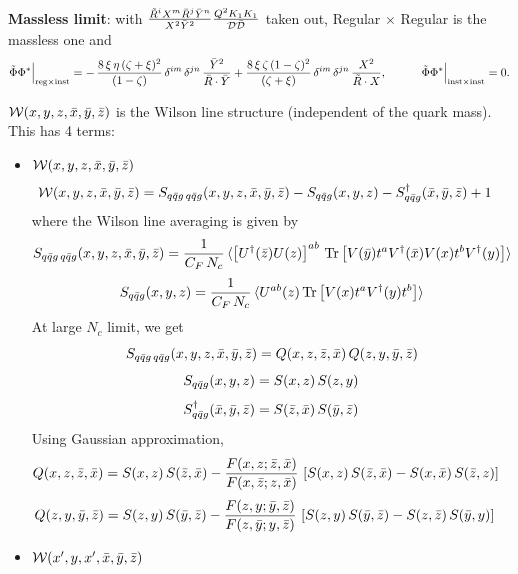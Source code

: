 \documentclass[9pt]{article}
\numberwithin{equation}{section}
\begin{document}
\textbf{Massless limit}: with $\frac{\Tilde{R}^{i}X^{m}\Bar{R}^{j}\Bar{Y}^{n}}{X^{2}\Bar{Y}^{2}}\frac{Q^{2}K_{1}K_{1}}{\mathcal{D}\Bar{\mathcal{D}}}$ taken out, Regular $\times$ Regular is the massless one and
$$\Tilde{\Phi}\Phi^{*}\Big|_{\text{reg}\times\text{inst}} = -\,\frac{8\,\xi\,\eta\,(\zeta+\xi)^{2}}{(1-\zeta)}\,\delta^{im}\,\delta^{jn}\,\frac{\Bar{Y}^{2}}{\Bar{R}\cdot\Bar{Y}} + \frac{8\,\xi\,\zeta\,(1-\zeta)^{2}}{(\zeta+\xi)}\,\delta^{im}\,\delta^{jn}\,\frac{X^{2}}{\Tilde{R}\cdot X},\hspace{3em}\Tilde{\Phi}\Phi^{*}\Big|_{\text{inst}\times\text{inst}}=0.$$

$\mathcal{W}(x,y,z,\Bar{x},\Bar{y},\Bar{z})$ is the Wilson line structure (independent of the quark mass). This has 4 terms:

\begin{itemize}
    \item $\mathcal{W}(x,y,z,\Bar{x},\Bar{y},\Bar{z})$
    \begin{align}
        \mathcal{W}(x,y,z,\Bar{x},\Bar{y},\Bar{z}) & = S_{q\Bar{q}g\,q\Bar{q}g}(x,y,z,\Bar{x},\Bar{y},\Bar{z}) -S_{q\Bar{q}g}(x,y,z) - S^{\dagger}_{q\Bar{q}g}(\Bar{x},\Bar{y},\Bar{z}) + 1
    \end{align}
where the Wilson line averaging is given by 
$$S_{q\Bar{q}g\,q\Bar{q}g}(x,y,z,\Bar{x},\Bar{y},\Bar{z}) = \frac{1}{C_{F}\,N_{c}}\, \langle \left[U^{\dagger}(\Bar{z})U(z)\right]^{ab}\, \text{Tr}\left[V(\Bar{y})t^{a}V^{\dagger}(\Bar{x})V(x)t^{b}V^{\dagger}(y)\right] \rangle$$
$$S_{q\Bar{q}g}(x,y,z) =  \frac{1}{C_{F}\,N_{c}}\, \langle U^{ab}(z)\,\text{Tr}\left[V(x)t^{a}V^{\dagger}(y)t^{b}\right]\rangle$$
At large $N_{c}$ limit, we get
$$S_{q\Bar{q}g\,q\Bar{q}g}(x,y,z,\Bar{x},\Bar{y},\Bar{z}) = Q(x,z,\Bar{z},\Bar{x})\, Q(z,y,\Bar{y},\Bar{z})$$
$$S_{q\Bar{q}g}(x,y,z) = S(x,z)\, S(z,y)$$
$$S^{\dagger}_{q\Bar{q}g}(\Bar{x},\Bar{y},\Bar{z}) = S(\Bar{z},\Bar{x})\, S(\Bar{y},\Bar{z})$$
Using Gaussian approximation,
\begin{align}
    Q(x,z,\Bar{z},\Bar{x}) & = S(x,z)\,S(\Bar{z},\Bar{x}) - \frac{F(x,z;\Bar{z},\Bar{x})}{F(x,\Bar{z};z,\Bar{x})}\, \left[S(x,z)\,S(\Bar{z},\Bar{x})-S(x,\Bar{x})\, S(\Bar{z},z)\right]
\end{align}
\begin{align}
    Q(z,y,\Bar{y},\Bar{z}) & = S(z,y)\,S(\Bar{y},\Bar{z}) - \frac{F(z,y;\Bar{y},\Bar{z})}{F(z,\Bar{y};y,\Bar{z})}\,\left[S(z,y)\,S(\Bar{y},\Bar{z})-S(z,\Bar{z})\,S(\Bar{y},y)\right]
\end{align}
\item $\mathcal{W}(x',y,x',\Bar{x},\Bar{y},\Bar{z})$

\end{itemize}
\end{document}
